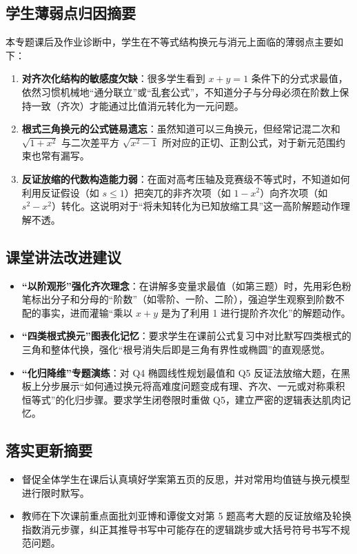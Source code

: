 \documentclass[12pt,a4paper]{ctexart}
\begin{document}
\subsection{学生薄弱点归因摘要}
本专题课后及作业诊断中，学生在不等式结构换元与消元上面临的薄弱点主要如下：
\begin{enumerate}[label=\arabic*. , leftmargin=2em, itemsep=0.1em, topsep=0.2em]
  \item \textbf{对齐次化结构的敏感度欠缺}：很多学生看到 \(x+y=1\) 条件下的分式求最值，依然习惯机械地“通分联立”或“乱套公式”，不知道分子与分母必须在阶数上保持一致（齐次）才能通过比值消元转化为一元问题。
  \item \textbf{根式三角换元的公式链易遗忘}：虽然知道可以三角换元，但经常记混二次和 \(\sqrt{1+x^2}\) 与二次差平方 \(\sqrt{x^2-1}\) 所对应的正切、正割公式，对于新元范围约束也常有漏写。
  \item \textbf{反证放缩的代数构造能力弱}：在面对高考压轴及竞赛级不等式时，不知道如何利用反证假设（如 \(s \leqslant 1\)）把突兀的非齐次项（如 \(1-x^2\)）向齐次项（如 \(s^2-x^2\)）转化。这说明对于“将未知转化为已知放缩工具”这一高阶解题动作理解不透。
\end{enumerate}

\subsection{课堂讲法改进建议}
\begin{itemize}[leftmargin=2em, itemsep=0.1em, topsep=0.2em]
  \item \textbf{“以阶观形”强化齐次理念}：在讲解多变量求最值（如第三题）时，先用彩色粉笔标出分子和分母的“阶数”（如零阶、一阶、二阶），强迫学生观察到阶数不配的事实，进而灌输“乘以 \(x+y\) 是为了利用 1 进行提阶齐次化”的解题动作。
  \item \textbf{“四类根式换元”图表化记忆}：要求学生在课前公式复习中对比默写四类根式的三角和整体代换，强化“根号消失后即是三角有界性或椭圆”的直观感觉。
  \item \textbf{“化归降维”专题演练}：对 Q4 椭圆线性规划最值和 Q5 反证法放缩大题，在黑板上分步展示“如何通过换元将高难度问题变成有理、齐次、一元或对称乘积恒等式”的化归步骤。要求学生闭卷限时重做 Q5，建立严密的逻辑表达肌肉记忆。
\end{itemize}

\subsection{落实更新摘要}
\begin{itemize}[leftmargin=2em, itemsep=0.1em, topsep=0.2em]
  \item 督促全体学生在课后认真填好学案第五页的反思，并对常用均值链与换元模型进行限时默写。
  \item 教师在下次课前重点面批刘亚博和谭俊文对第 5 题高考大题的反证放缩及轮换指数消元步骤，纠正其推导书写中可能存在的逻辑跳步或大括号符号书写不规范问题。
\end{itemize}

\endgroup
\end{document}
